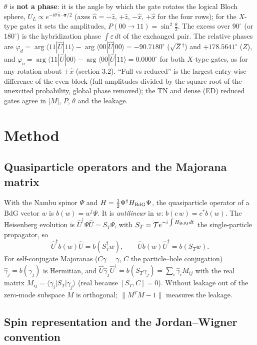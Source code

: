\documentclass[11pt]{article}
\newcommand{\ket}[1]{|#1\rangle}
\newcommand{\bra}[1]{\langle#1|}
\begin{document}
$\theta$ is \textbf{not a phase}: it is the angle by which the gate rotates the logical Bloch sphere, $U_L\propto e^{-i\theta\,\hat n\cdot\boldsymbol\sigma/2}$
(axes $\hat n = -\hat z$, $+\hat z$, $-\hat x$, $+\hat x$ for the four rows); for the $X$-type gates it sets the amplitudes,
$P(00\to11) = \sin^2\frac\theta2$. The excess over $90^\circ$ (or $180^\circ$) is the hybridization phase $\int\varepsilon\,dt$ of the exchanged pair.
The relative phases are $\varphi_d = \arg\bra{11}\hat U\ket{11} - \arg\bra{00}\hat U\ket{00} = -90.7180^\circ$ ($\sqrt{Z}{}^\dagger$) and $+178.5641^\circ$ ($Z$), and
$\varphi_o = \arg\bra{11}\hat U\ket{00} - \arg\bra{00}\hat U\ket{11} = 0.0000^\circ$ for both $X$-type gates, as for any rotation about $\pm\hat x$
(section 3.2). ``Full vs reduced'' is the largest entry-wise difference of the even block (full amplitudes divided by the square
root of the unexcited probability, global phase removed); the TN and dense (ED) reduced gates agree in $|M|$, $P$, $\theta$ and the leakage.

\section{Method}

\subsection{Quasiparticle operators and the Majorana matrix}

With the Nambu spinor $\Psi$ and $H = \tfrac12\Psi^\dagger H_{\rm BdG}\Psi$, the quasiparticle operator of a BdG vector $w$ is
$b(w) = w^\dagger\Psi$. It is \emph{antilinear} in $w$: $b(c\,w) = c^*b(w)$. The Heisenberg evolution is $\hat U^\dagger\Psi\hat U = S_T\Psi$, with
$S_T = \mathcal T e^{-i\int H_{\rm BdG}dt}$ the single-particle propagator, so
\[
\hat U^\dagger b(w)\hat U = b(S_T^\dagger w),\qquad \hat U b(w)\hat U^\dagger = b(S_Tw).
\]
For self-conjugate Majoranas ($C\gamma = \gamma$, $C$ the particle--hole conjugation) $\hat\gamma_j = b(\gamma_j)$ is Hermitian, and
$\hat U\hat\gamma_j\hat U^\dagger = b(S_T\gamma_j) = \sum_i\hat\gamma_i M_{ij}$ with the real matrix $M_{ij} = \bra{\gamma_i}S_T\ket{\gamma_j}$ (real because
$[S_T, C] = 0$). Without leakage out of the zero-mode subspace $M$ is orthogonal; $\|M^TM - 1\|$ measures the leakage.

\subsection{Spin representation and the Jordan--Wigner convention}
\end{document}
